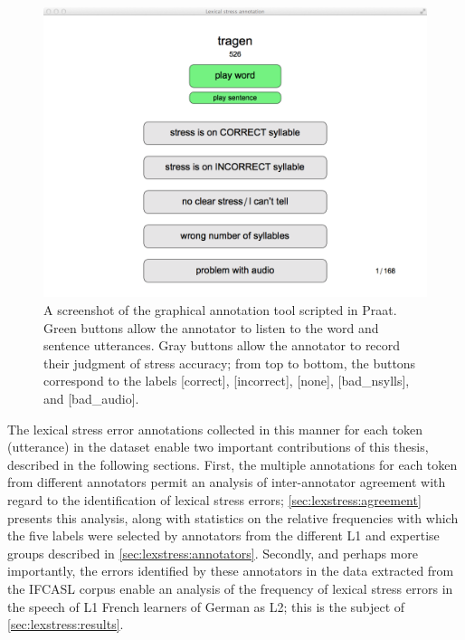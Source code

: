 		\begin{figure}[t]
			\centering
			\includegraphics[width=\textwidth]{img/screenshots/AnnotationTool}
			\caption[A screenshot of the graphical annotation tool scripted in Praat.]{A screenshot of the graphical annotation tool scripted in Praat. Green buttons allow the annotator to listen to  the word and sentence utterances. Gray buttons allow the annotator to record their judgment of stress accuracy; from top to bottom, the buttons correspond to the labels [correct], [incorrect], [none], [bad\_nsylls], and [bad\_audio].}
			\label{fig:annotationtool}
		\end{figure}
		
		
		
		The lexical stress error 
		annotations collected in this manner for each token (utterance) in the dataset enable two important contributions of this thesis, described in the following sections. 
		First, the multiple annotations for each token from different annotators permit an analysis of inter-annotator agreement with regard to the identification of lexical stress errors; \cref{sec:lexstress:agreement} presents this analysis, along with statistics on the relative frequencies with which the five labels were selected by annotators from the different L1 and expertise groups described in \cref{sec:lexstress:annotators}.
		Secondly, and perhaps more importantly, the errors identified by these annotators in the data extracted from the IFCASL corpus enable an analysis of the frequency of lexical stress errors in the speech of L1 French learners of German as L2; this is the subject of \cref{sec:lexstress:results}.
		
